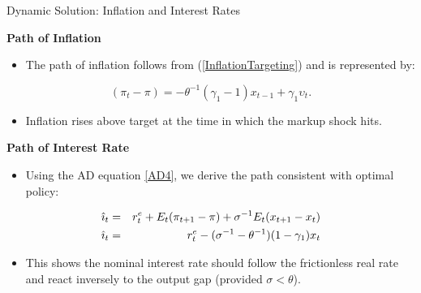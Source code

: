 \documentclass[11pt,aspectratio=169]{beamer}
\begin{document}
\begin{frame}{Dynamic Solution: Inflation and Interest Rates}
\small

\textbf{Path of Inflation}
\begin{itemize}
    \item The path of inflation follows from (\ref{InflationTargeting}) and is represented by:
\end{itemize}
\begin{equation*}
(\pi _{t}-\pi )=-\theta ^{-1}(\gamma _{1}-1)x_{t-1}+\gamma _{1}\upsilon _{t}.
\end{equation*}
\begin{itemize}
    \item Inflation rises above target at the time in which the markup shock hits.
\end{itemize}

\textbf{Path of Interest Rate}
\begin{itemize}
    \item Using the AD equation \eqref{AD4}, we derive the path consistent with optimal policy:
\end{itemize}
\begin{eqnarray}
\hat{\imath}_{t} &=&r_{t}^{e}+E_{t}(\pi _{t+1}-\pi )+\sigma
^{-1}E_{t}(x_{t+1}-x_{t}) \notag \\
\hat{\imath}_{t} &=&r_{t}^{e}-(\sigma ^{-1}-\theta ^{-1})(1-\gamma
_{1})x_{t} \label{iopt2}
\end{eqnarray}
\begin{itemize}
    \item This shows the nominal interest rate should follow the frictionless real rate and react inversely to the output gap (provided $\sigma<\theta$).
\end{itemize}

\end{frame}
\end{document}
